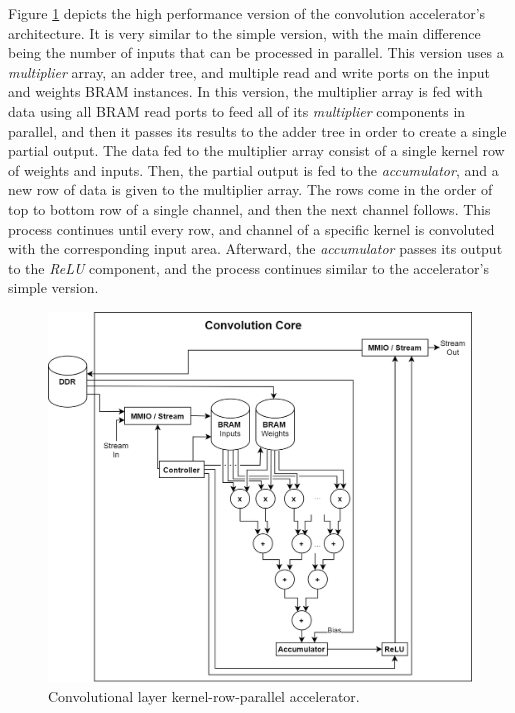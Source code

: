 Figure \ref{fig:conv-core-row-parallel} depicts the high performance version of the convolution accelerator's architecture. It is very similar to the simple version, with the main difference being the number of inputs that can be processed in parallel. This version uses a \emph{multiplier} array, an adder tree, and multiple read and write ports on the input and weights BRAM instances. In this version, the multiplier array is fed with data using all BRAM read ports to feed all of its \emph{multiplier} components in parallel, and then it passes its results to the adder tree in order to create a single partial output. The data fed to the multiplier array consist of a single kernel row of weights and inputs. Then, the partial output is fed to the \emph{accumulator}, and a new row of data is given to the multiplier array. The rows come in the order of top to bottom row of a single channel, and then the next channel follows. This process continues until every row, and channel of a specific kernel is convoluted with the corresponding input area. Afterward, the \emph{accumulator} passes its output to the \emph{ReLU} component, and the process continues similar to the accelerator's simple version.

\begin{figure} [H]
	\centering
	\includegraphics[width=\textwidth]{Images/Platform/Conv_core_row_parallel.png}
	\decoRule
	\caption[Convolutional layer kernel-row-parallel accelerator]{Convolutional layer kernel-row-parallel accelerator.}
	\label{fig:conv-core-row-parallel}
\end{figure}

